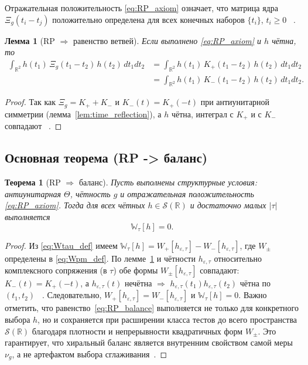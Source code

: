 \documentclass{article}
\numberwithin{equation}{section}
\theoremstyle{plain}
\newtheorem{theorem}{Теорема}
\newtheorem{lemma}{Лемма}
\theoremstyle{definition}
\theoremstyle{remark}
\def\Rightarrow{⇒}%
\begin{document}
Отражательная положительность \eqref{eq:RP_axiom} означает, что матрица ядра $\Xi_g(t_i-t_j)$ положительно определена для всех конечных наборов $\{t_i\}$, $t_i\ge0$ ~\cite{Berg1984}.

\begin{lemma}[RP $\Rightarrow$ равенство ветвей]
\label{lem:RP_equal_branches}
Если выполнено \eqref{eq:RP_axiom} и $h$ чётна, то
\begin{equation}
	\label{eq:equal_branches}
	\begin{aligned}
		\int_{\mathbb R^2}\!h(t_1)\,\Xi_g(t_1-t_2)\,h(t_2)\,dt_1dt_2
		&=\int_{\mathbb R^2}\!h(t_1)\,K_+(t_1-t_2)\,h(t_2)\,dt_1dt_2
		\\
		&=\int_{\mathbb R^2}\!h(t_1)\,K_-(t_1-t_2)\,h(t_2)\,dt_1dt_2.
	\end{aligned}
\end{equation}

\end{lemma}

\begin{proof}
Так как $\Xi_g=K_++K_-$ и $K_-(t)=K_+(-t)$ при антиунитарной симметрии (лемма~\ref{lem:time_reflection}),
а $h$ чётна, интеграл с $K_+$ и с $K_-$ совпадают ~\cite{Bochner1959}.
\end{proof}

\subsection{Основная теорема (RP -> баланс)}

\begin{theorem}[RP $\Rightarrow$ баланс]
\label{thm:RP_balance}
Пусть выполнены структурные условия: антиунитарная $\Theta$, чётность $g$ и отражательная положительность \eqref{eq:RP_axiom}.
Тогда для всех чётных $h\in\mathcal S(\mathbb R)$ и достаточно малых $|\tau|$ выполняется
\begin{equation}
\label{eq:RP_balance}
\mathbb W_\tau[h]=0.
\end{equation}
\end{theorem}

\begin{proof}
Из \eqref{eq:Wtau_def} имеем $\mathbb W_\tau[h]=W_+[h_{\varepsilon,\tau}]-W_-[h_{\varepsilon,\tau}]$,
где $W_\pm$ определены в \eqref{eq:Wpm_def}.
По лемме~\ref{lem:RP_equal_branches} и чётности $h_{\varepsilon,\tau}$ относительно комплексного сопряжения (в $\tau$)
обе формы $W_\pm[h_{\varepsilon,\tau}]$ совпадают:
$K_-(t)=K_+(-t)$, а $h_{\varepsilon,\tau}(t)$ нечётна $\Rightarrow$
$h_{\varepsilon,\tau}(t_1)h_{\varepsilon,\tau}(t_2)$ чётна по $(t_1,t_2)$ ~\cite{Widder1941}.
Следовательно, $W_+[h_{\varepsilon,\tau}]=W_-[h_{\varepsilon,\tau}]$ и $\mathbb W_\tau[h]=0$.
Важно отметить, что равенство~\eqref{eq:RP_balance} выполняется не только для конкретного выбора $h$, 
но и сохраняется при расширении класса тестов до всего пространства $\mathcal{S}(\mathbb{R})$ благодаря 
плотности и непрерывности квадратичных форм $W_\pm$. Это гарантирует, что хиральный баланс является 
внутренним свойством самой меры $\nu_g$, а не артефактом выбора сглаживания~\cite{ReedSimonII}.
\end{proof}
\end{document}
